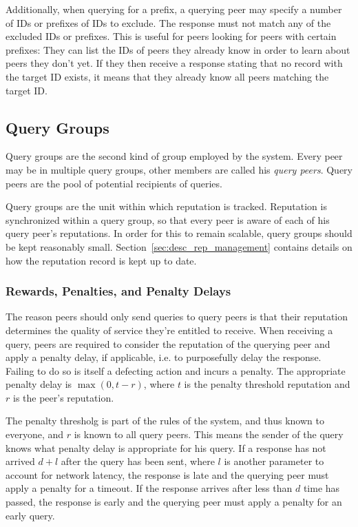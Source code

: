 Additionally, when querying for a prefix, a querying peer may specify a number
of IDs or prefixes of IDs to exclude. The response must not match any of the
excluded IDs or prefixes. This is useful for peers looking for peers with
certain prefixes: They can list the IDs of peers they already know in order to
learn about peers they don't yet. If they then receive a response stating that
no record with the target ID exists, it means that they already know all peers
matching the target ID.

\subsection{Query Groups}
\label{sec:desc_query_groups}
Query groups are the second kind of group employed by the system. Every peer may
be in multiple query groups, other members are called his \emph{query peers}.
Query peers are the pool of potential recipients of queries.

Query groups are the unit within which reputation is tracked. Reputation is
synchronized within a query group, so that every peer is aware of each of his
query peer's reputations. In order for this to remain scalable, query groups
should be kept reasonably small. Section~\ref{sec:desc_rep_management} contains
details on how the reputation record is kept up to date.

\subsubsection{Rewards, Penalties, and Penalty Delays}
The reason peers should only send queries to query peers is that their
reputation determines the quality of service they're entitled to receive. When
receiving a query, peers are required to consider the reputation of the querying
peer and apply a penalty delay, if applicable, i.e. to purposefully delay the
response. Failing to do so is itself a defecting action and incurs a penalty.
The appropriate penalty delay is $\max(0, t - r)$, where $t$ is the penalty
threshold reputation and $r$ is the peer's reputation.

The penalty thresholg is part of the rules of the system, and thus known to
everyone, and $r$ is known to all query peers. This means the sender of the
query knows what penalty delay is appropriate for his query. If a response has
not arrived $d + l$ after the query has been sent, where $l$ is another
parameter to account for network latency, the response is late and the querying
peer must apply a penalty for a timeout. If the response arrives after less than
$d$ time has passed, the response is early and the querying peer must apply a
penalty for an early query.

